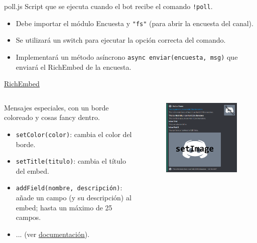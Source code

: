 \documentclass[10pt]{beamer} %
\begin{document}
\begin{frame}{poll.js}
    Script que se ejecuta cuando el bot recibe el comando \texttt{!poll}.
    \begin{itemize}
        \item Debe importar el módulo Encuesta y \texttt{"fs"} (para abrir la encuesta del canal).
        \item Se utilizará un switch para ejecutar la opción correcta del comando.
        \item Implementará un método asíncrono \texttt{async enviar(encuesta, msg)} que enviará el RichEmbed de la encuesta.
    \end{itemize}
\end{frame}
\begin{frame}{\href{https://discord.js.org/\#/docs/main/stable/class/RichEmbed}{\underline{RichEmbed}}}
\begin{columns}
\begin{column}{.5\linewidth}
    Mensajes especiales, con un borde coloreado y cosas fancy dentro.
    \begin{itemize}
        \item \texttt{setColor(color)}: cambia el color del borde.
        \item \texttt{setTitle(titulo)}: cambia el título del embed.
        \item \texttt{addField(nombre, descripción)}: añade un campo (y su descripción) al embed; hasta un máximo de 25 campos.
        \item ... (ver \href{https://discord.js.org/\#/docs/main/stable/class/RichEmbed}{\underline{documentación}}).
    \end{itemize}
\end{column}
\begin{column}{.5\linewidth}
    	\begin{figure}[h]
		\includegraphics[width=\linewidth,]{embed.png}

\end{figure}
\end{column}
\end{columns}
\end{frame}
\end{document}
